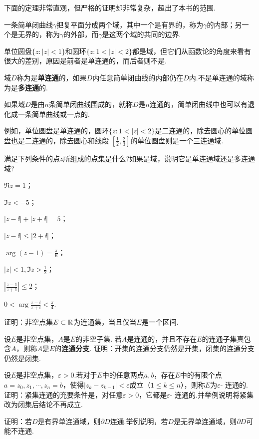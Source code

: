 下面的定理非常直观，但严格的证明却非常复杂，超出了本书的范围.
\begin{theorem}
  一条简单闭曲线$\gamma$把复平面分成两个域，其中一个是有界的，称为$\gamma$的内部；另一个是无界的，称为$\gamma$的外部，而$\gamma$是这两个域的共同的边界.
\end{theorem}

单位圆盘$\{z:|z|<1\}$和圆环$\{z:1<|z|<2\}$都是域，但它们从函数论的角度来看有很大的差别，原因是前者是单连通的，而后者则不是.
\begin{definition}
  域$D$称为是\textbf{单连通}的，如果$D$内任意简单闭曲线的内部仍在$D$内.不是单连通的域称为是\textbf{多连通}的.
\end{definition}
\begin{definition}
  如果域$D$是由$n$条简单闭曲线围成的，就称$D$是$n$连通的，简单闭曲线中也可以有退化成一条简单曲线或一点的.
\end{definition}

例如，单位圆盘是单连通的，圆环$\{z:1<|z|<2\}$是二连通的，除去圆心的单位圆盘也是二连通的，除去圆心和线段
$\left[\frac12,\frac23\right]$的单位圆盘则是一个三连通域.
\begin{xiti}\hypertarget{xiti1.6}{}
  \item 满足下列条件的点$z$所组成的点集是什么?如果是域，说明它是单连通域还是多连通域?
    \begin{enuma}
      \item $\Re z=1$；
      \item $\Im z<-5$；
      \item $|z-\ii |+|z+\ii |=5$；
      \item $|z-\ii |\le|2+\ii |$；
      \item $\arg(z-1)=\frac\pi6$；
      \item $|z|<1,\Im z>\frac12$；
      \item $\left|\frac{z-1}{z+1}\right|\le2$；
      \item $0<\arg\frac{z-\ii }{z+\ii }<\frac\pi4$.
    \end{enuma}
  \item \hypertarget{xiti1.6.2}{}证明：非空点集$E\subset \mathbb R$为连通集，当且仅当$E$是一个区间.
  \item 设$E$是非空点集，$A$是$E$的非空子集. 若$A$是连通的，并且不存在$E$的连通子集真包含$A$，则称$A$是$E$的\textbf{连通分支}. 证明：开集的连通分支仍然是开集，闭集的连通分支仍然是闭集.
  \item 设$E$是非空点集，$\varepsilon>0$.若对于$E$中的任意两点$a,b$，存在$E$中的有限个点$a=z_0,z_1,\cdots,z_n=b$，使得$|z_k-z_{k-1}|<\varepsilon$成立（$1\le k\le n$），则称$E$为$\varepsilon$- 连通的. 证明：紧集连通的充要条件是，对任意$\varepsilon>0$，它都是$ \varepsilon$- 连通的.并举例说明将紧集改为闭集后结论不再成立.
  \item 证明：若$D$是有界单连通域，则$\partial D$连通.举例说明，若$D$是无界单连通域，则$\partial D$可能不连通.
\end{xiti}

